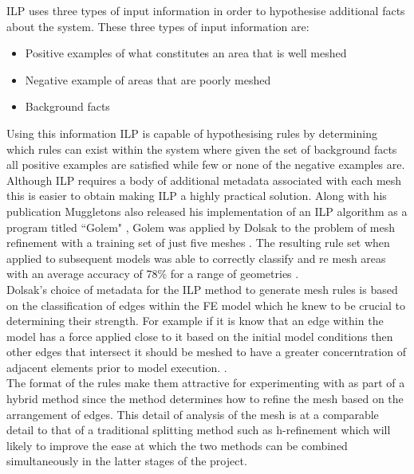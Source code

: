 \documentclass{article}
\begin{document}
\noindent
ILP uses three types of input information in order to hypothesise additional facts about the system. These three types of input information are: \\ 

\begin{itemize}
\item Positive examples  of what constitutes an area that is well meshed
\item Negative example of areas that are poorly meshed
\item Background facts
\end{itemize}

\noindent
Using this information ILP is capable of hypothesising rules by determining which rules can exist within the system where given the set of background facts all positive examples are satisfied while few or none of the negative examples are. Although ILP requires a body of additional metadata associated with each mesh this is easier to obtain making ILP a highly practical solution. Along with his publication Muggletons also released his implementation of an ILP algorithm as a program titled ``Golem" \cite{Golem}, Golem was applied by Dolsak to the problem of mesh refinement with a training set of just five meshes \cite{DolsakPaper94}. The resulting rule set when applied to subsequent models was able to correctly classify and re mesh areas with an average accuracy of 78\% for a range of geometries \cite{DolsakPaper94} \cite{appOfILPToFEMeshDesign}. \\

\noindent
Dolsak's choice of metadata for the ILP method to generate mesh rules is based on the classification of edges within the FE model which he knew to be crucial to determining their strength. For example if it is know that an edge within the model has a force applied close to it based on the initial model conditions then other edges that intersect it should be meshed to have a greater concerntration of adjacent elements prior to model execution. \cite{DolsakPaper91} \cite{appOfILPToFEMeshDesign}.\\ 

\noindent
The format of the rules make them attractive for experimenting with as part of a hybrid method since the method determines how to refine the mesh based on the arrangement of edges. This detail of analysis of the mesh is at a comparable detail to that of a traditional splitting method such as h-refinement which will likely to improve the ease at which the two methods can be combined simultaneously in the latter stages of the project. \\ 
\end{document}
